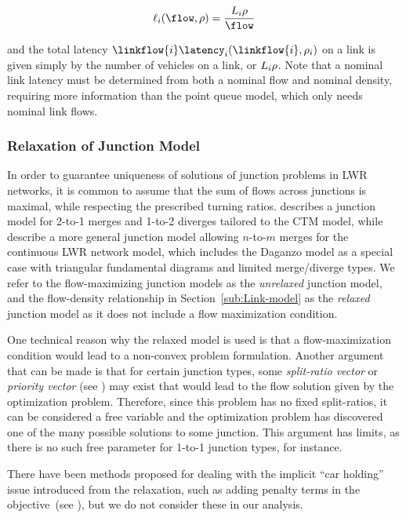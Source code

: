 \[
\ell_{\link}\left(\flow,\density\right)=\frac{\length_{\link}\density}{\flow}
\]


and the total latency $\linkflow{\link}\latency_{\link}\left(\linkflow{\link},\density_{\link}\right)$
on a link is given simply by the number of vehicles on a link, or
$L_{i}\rho$. Note that a nominal link latency must
be determined from both a nominal flow and nominal density, requiring
more information than the point queue model, which only needs nominal
link flows.


\subsubsection{Relaxation of Junction Model\label{sub:Relaxation-of-Junction}}

In order to guarantee uniqueness of solutions of junction problems
in LWR networks, it is common to assume that the sum of flows across
junctions is maximal, while respecting the prescribed turning ratios.
\cite{daganzo1995cell} describes a junction model for 2-to-1 merges
and 1-to-2 diverges tailored to the CTM model, while \cite{garavello2006traffic}
describe a more general junction model allowing $n$-to-$m$ merges
for the continuous LWR network model, which includes the Daganzo model
as a special case with triangular fundamental diagrams and limited
merge/diverge types. We refer to the flow-maximizing junction models
as the \emph{unrelaxed }junction model, and the flow-density relationship
in Section~\ref{sub:Link-model} as the \emph{relaxed} junction model
as it does not include a flow maximization condition.

One technical reason why the relaxed model is used is that a flow-maximization
condition would lead to a non-convex problem formulation. Another
argument that can be made is that for certain junction types, some
\emph{split-ratio vector} or \emph{priority vector }(see \cite{Coclite2002})
may exist that would lead to the flow solution given by the optimization
problem. Therefore, since this problem has no fixed split-ratios,
it can be considered a free variable and the optimization problem
has discovered one of the many possible solutions to some junction.
This argument has limits, as there is no such free parameter for 1-to-1
junction types, for instance.

There have been methods proposed for dealing with the implicit ``car
holding'' issue introduced from the relaxation, such as adding penalty
terms in the objective~(see \cite{ziliaskopoulos2000linear}), but
we do not consider these in our analysis.


